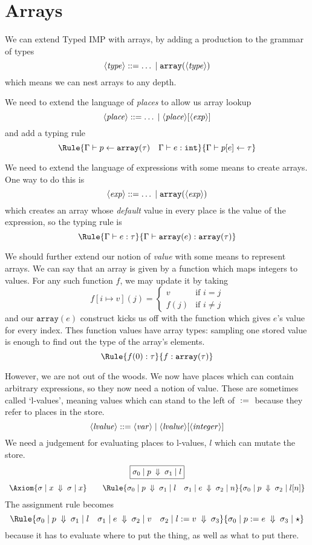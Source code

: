 \documentclass{article}
\begin{document}
\section{Arrays}

\newcommand{\arr}[1]{\mathtt{array}(#1)}
We can extend Typed IMP with arrays, by adding a production to the grammar
of types
\[
\NT{type} ::= \ldots \;|\; \arr{\NT{type}}
\]
which means we can nest arrays to any depth.

We need to extend the language of \emph{places} to allow us array lookup
\[
  \langle \mathit{place} \rangle ::= \ldots \;|\; \langle \mathit{place} \rangle[\langle \mathit{exp} \rangle]
\]
and add a typing rule
\[\Rule{\JPl\Gamma p{\arr{\tau}}\quad \JEx\Gamma e\intg}
       {\JPl\Gamma{p[e]}\tau}
\]

We need to extend the language of expressions with some means to
create arrays. One way to do this is
\[
  \NT{exp} ::= \ldots \;|\; \arr{\NT{exp}}
\]
which creates an array whose \emph{default} value in every place is the value of the expression, so the typing rule is
\[
  \Rule{\JEx\Gamma e\tau}
       {\JEx\Gamma{\arr{e}}{\arr{\tau}}}
\]
     
We should further extend our notion of \emph{value} with some means to represent arrays. We can say that an array is given by a function which maps integers to values. For any such function $f$, we may update it by taking
\[f[i\mapsto v](j) = \left\{\begin{array}{ll}
                              v & \mbox{if $i = j$} \\
                              f(j) & \mbox{if $i \neq j$}
                              \end{array}\right.
\]
and our $\arr{e}$ construct kicks us off with the function which gives
$e$'s value for every index. Thes function values have array types: sampling
one stored value is enough to find out the type of the array's elements.
\[\Rule{f(0):\tau}
       {f:\arr\tau}
  \]

However, we are not out of the woods. We now have places which can contain
arbitrary expressions, so they now need a notion of value. These are
sometimes called `l-values', meaning values which can stand to the left of $\;\mathtt{:=}\;$
because they refer to places in the store.
\[
  \langle \mathit{lvalue} \rangle ::= \langle \mathit{var} \rangle \;|\;\langle \mathit{lvalue} \rangle[\langle \mathit{integer} \rangle]
\]
We need a judgement for evaluating places to l-values, $l$ which can mutate the
store.
\[\begin{array}{c}
    \fbx{\JEv{\sigma_0}{p}{\sigma_1}{l}} \medskip \\
    \Axiom{\JEv{\sigma}x{\sigma}x} \qquad
    \Rule{\JEv{\sigma_0}p{\sigma_1}l\quad
    \JEv{\sigma_1}e{\sigma_2}n}
    {\JEv{\sigma_0}p{\sigma_2}{l[n]}}
  \end{array}  \]
The assignment rule
becomes
\[\Rule{\JEv{\sigma_0}p{\sigma_1}l\quad\JEv{\sigma_1}e{\sigma_2}v\quad\JPla{\sigma_2}lv{\sigma_3}}
  {\JEv{\sigma_0}{p\ass e}{\sigma_3}\star}
\]
because it has to evaluate where to put the thing, as well as what to put there.
\end{document}

